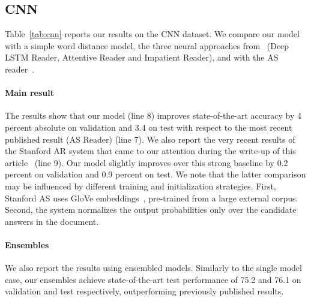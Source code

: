 \documentclass[11pt]{article}
\begin{document}
\subsection{CNN}
Table~\ref{tab:cnn} reports our results on the CNN dataset. We compare our model with a simple word distance model, the three neural approaches from~\cite{hermann2015teaching} (Deep LSTM Reader, Attentive Reader and Impatient Reader), and with the AS reader~\cite{watson}.

\paragraph{Main result} The results show that our model (line 8) improves state-of-the-art accuracy by 4 percent absolute on validation and 3.4 on test with respect to the most recent published result (AS Reader) (line 7). We also report the very recent results of the Stanford AR system that came to our attention during the write-up of this article~\cite{danqi} (line 9).
Our model slightly improves over this strong baseline by 0.2 percent on validation and 0.9 percent on test. We note that the latter comparison may be influenced by different training and initialization strategies. First, Stanford AS uses GloVe embeddings~\cite{pennington2014glove}, pre-trained from a large external corpus.
Second, the system normalizes the output probabilities only over the candidate answers in the document.


\paragraph{Ensembles} We also report the results using ensembled models. Similarly to the single model case, our ensembles achieve state-of-the-art test performance of 75.2 and 76.1 on validation and test respectively, outperforming previously published results.
\end{document}
